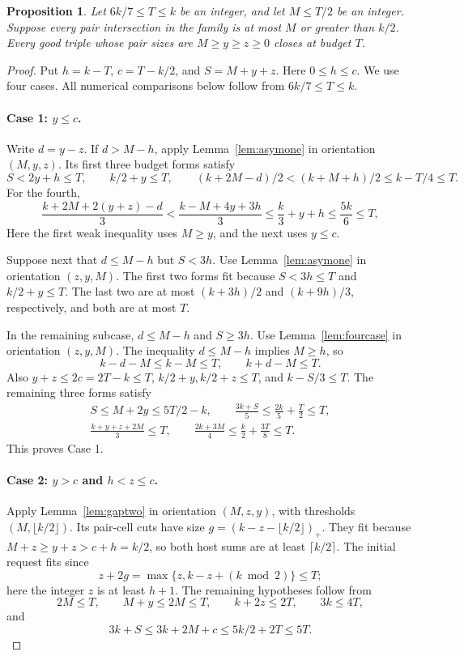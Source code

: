 \documentclass[11pt]{article}
\numberwithin{equation}{section}
\newtheorem{proposition}[theorem]{Proposition}
\theoremstyle{definition}
\theoremstyle{remark}
\begin{document}
\begin{proposition}\label{prop:localfinish}
Let $6k/7\le T\le k$ be an integer, and let $M\le T/2$ be an integer.
Suppose every pair intersection in the family is at most $M$ or greater
than $k/2$. Every good triple whose pair sizes are
$M\ge y\ge z\ge0$ closes at budget $T$.
\end{proposition}
\begin{proof}
Put $h=k-T$, $c=T-k/2$, and $S=M+y+z$.
Here $0\le h\le c$. We use four cases. All numerical comparisons
below follow from $6k/7\le T\le k$.

\paragraph{Case 1: $y\le c$.}
Write $d=y-z$. If $d>M-h$, apply Lemma~\ref{lem:asymone} in orientation
$(M,y,z)$. Its first three budget forms satisfy
\[
 S<2y+h\le T,\qquad k/2+y\le T,\qquad
 (k+2M-d)/2<(k+M+h)/2\le k-T/4\le T.
\]
For the fourth,
\[
 \frac{k+2M+2(y+z)-d}{3}
 <\frac{k-M+4y+3h}{3}
 \le\frac{k}{3}+y+h\le\frac{5k}{6}\le T,
\]
Here the first weak inequality uses $M\ge y$, and the next uses $y\le c$.

Suppose next that $d\le M-h$ but $S<3h$.
Use Lemma~\ref{lem:asymone} in orientation $(z,y,M)$.
The first two forms fit because $S<3h\le T$ and $k/2+y\le T$.
The last two are at most $(k+3h)/2$ and $(k+9h)/3$, respectively,
and both are at most $T$.

In the remaining subcase, $d\le M-h$ and $S\ge3h$.
Use Lemma~\ref{lem:fourcase} in orientation $(z,y,M)$.
The inequality $d\le M-h$ implies $M\ge h$, so
\[
 k-d-M\le k-M\le T,\qquad k+d-M\le T.
\]
Also $y+z\le2c=2T-k\le T$, $k/2+y,k/2+z\le T$, and
$k-S/3\le T$. The remaining three forms satisfy
\begin{gather*}
 S\le M+2y\le5T/2-k,
 \qquad \frac{3k+S}{5}\le\frac{2k}{5}+\frac T2\le T,\\
 \frac{k+y+z+2M}{3}\le T,
 \qquad \frac{2k+3M}{4}\le\frac k2+\frac{3T}{8}\le T.
\end{gather*}
This proves Case 1.

\paragraph{Case 2: $y>c$ and $h<z\le c$.}
Apply Lemma~\ref{lem:gaptwo} in orientation $(M,z,y)$, with
thresholds $(M,\lfloor k/2\rfloor)$.
Its pair-cell cuts have size $g=(k-z-\lfloor k/2\rfloor)_+$.
They fit because $M+z\ge y+z>c+h=k/2$, so both host sums are at
least $\lceil k/2\rceil$.
The initial request fits since
\[
 z+2g=\max\{z,k-z+(k\bmod2)\}\le T;
\]
here the integer $z$ is at least $h+1$.
The remaining hypotheses follow from
\[
 2M\le T,\qquad M+y\le2M\le T,\qquad
 k+2z\le2T,\qquad3k\le4T,
\]
and
\[
 3k+S\le3k+2M+c\le5k/2+2T\le5T.
\]


\end{proof}
\end{document}
